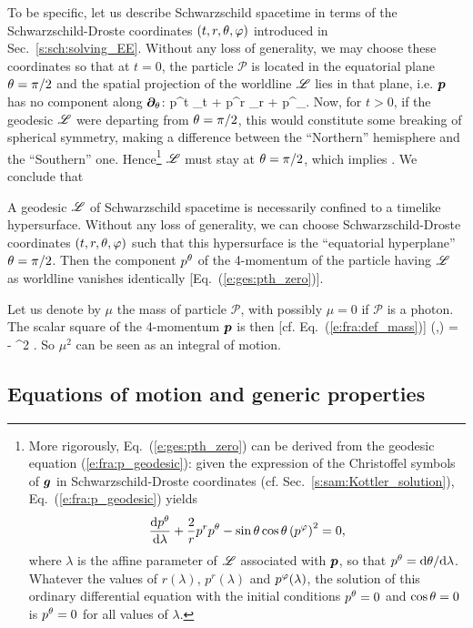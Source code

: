 To be specific, let us describe Schwarzschild spacetime in terms of the
Schwarzschild-Droste coordinates $(t,r,\theta,\varphi)$ introduced in Sec.~\ref{s:sch:solving_EE}.
Without any loss of generality, we may choose these coordinates so that
at $t=0$, the particle $\mathscr{P}$ is located in the equatorial plane $\theta=\pi/2$ and
the spatial projection of the worldline $\mathscr{L}$ lies in that plane, i.e. $\bm{p}$ has
no component along $\bm{\partial}_\theta$:
\be
      p^t \wpar_{t} + p^r \wpar_r + p^\ph \wpar_\ph .
\ee
Now, for $t>0$, if the geodesic $\mathscr{L}$ were departing from $\theta=\pi/2$, this
would constitute some breaking of spherical symmetry, making a difference
between the ``Northern'' hemisphere and the ``Southern'' one.
Hence\footnote{More rigorously, Eq.~(\ref{e:ges:pth_zero}) can
be derived from the geodesic equation (\ref{e:fra:p_geodesic}): given
the expression of the Christoffel symbols of $\bm{g}$ in Schwarzschild-Droste
coordinates (cf. Sec.~\ref{s:sam:Kottler_solution}), Eq.~(\ref{e:fra:p_geodesic})
yields \[\frac{\mathrm{d} p^\theta}{\mathrm{d}\lambda} +\frac{2}{r}  p^r p^\theta - \sin\theta\cos\theta \left( p^\varphi \right)^2 = 0,\] where $\lambda$ is the affine parameter of $\mathscr{L}$ associated with $\bm{p}$,
so that $p^\theta=\mathrm{d}\theta/\mathrm{d}\lambda$. Whatever the values of $r(\lambda)$,
$p^r(\lambda)$ and $p^\varphi(\lambda)$,
the solution of this ordinary differential equation with the initial conditions $p^\theta=0$ and
$\cos\theta=0$ is $p^\theta=0$ for all values of $\lambda$.} $\mathscr{L}$
must stay at $\theta=\pi/2$, which implies
\be \label{e:ges:pth_zero}
     .
\ee
We conclude that
\begin{greybox}
A geodesic $\mathscr{L}$ of Schwarzschild spacetime is necessarily confined to a timelike hypersurface.
Without any loss of generality, we can choose Schwarzschild-Droste coordinates $(t,r,\theta,\varphi)$
such that this hypersurface is the ``equatorial hyperplane'' $\theta=\pi/2$.
Then the component $p^\theta$ of the 4-momentum of the particle having $\mathscr{L}$ as worldline
vanishes identically [Eq.~(\ref{e:ges:pth_zero})].
\end{greybox}

Let us denote by $\mu$ the mass of particle $\mathscr{P}$, with possibly
$\mu=0$ if $\mathscr{P}$ is a photon. The scalar square of the 4-momentum $\bm{p}$ is
then [cf. Eq.~(\ref{e:fra:def_mass})]
\be \label{e:ges:p2_mu2}
    (,) = - \mu^2 .
\ee
So $\mu^2$ can be seen as an integral of motion.

\subsection{Equations of motion and generic properties} \label{s:ges:eq_to_be_solved}

